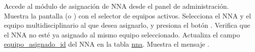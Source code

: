 \begin{UCtrayectoria}
	\UCpaso[\UCactor] Accede al módulo de asignación de NNA desde el panel de administración.
	\UCpaso Muestra la pantalla  (o ) con el selector de equipos activos.
	\UCpaso[\UCactor] \label{CU-12.selecciona} Selecciona el NNA y el equipo multidisciplinario al que desea asignarlo, y presiona el botón .  
	\UCpaso Verifica que el NNA no esté ya asignado al mismo equipo seleccionado. 
	\UCpaso Actualiza el campo \hyperlink{NNA.equipo_asignado_id}{equipo\_asignado\_id} del NNA en la tabla \hyperlink{NNA}{nna}.
	\UCpaso Muestra el mensaje .
\end{UCtrayectoria}
